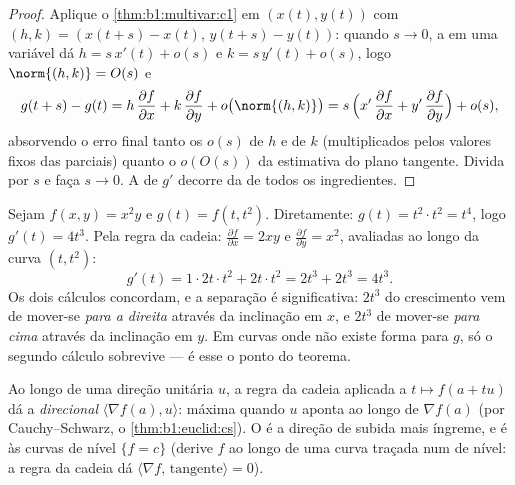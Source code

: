 \begin{proof}
Aplique o \cref{thm:b1:multivar:c1} em $(x(t), y(t))$ com $(h, k) =
(x(t+s) - x(t),\, y(t+s) - y(t))$: quando $s \to 0$, a 
em uma variável dá $h = s\,x'(t) + o(s)$ e $k = s\,y'(t)
+ o(s)$, logo $\norm{(h, k)} = O(s)$ e
\[
g(t+s) - g(t)
= h\,\frac{\partial f}{\partial x} + k\,\frac{\partial
f}{\partial y} + o\bigl(\norm{(h,k)}\bigr)
= s\,\Bigl(x'\,\frac{\partial f}{\partial x} +
y'\,\frac{\partial f}{\partial y}\Bigr) + o(s) ,
\]
absorvendo o erro final tanto os $o(s)$ de $h$ e de $k$
(multiplicados pelos valores fixos das parciais) quanto o $o(O(s))$ da
estimativa do plano tangente. Divida por $s$ e faça $s \to 0$. A
 de $g'$ decorre da de todos os ingredientes.
\end{proof}

\begin{example}
\label{ex:b1:multivar:chainrun}
Sejam $f(x, y) = x^2 y$ e $g(t) = f(t, t^2)$. Diretamente: $g(t) =
t^2\cdot t^2 = t^4$, logo $g'(t) = 4t^3$. Pela regra da
cadeia: $\frac{\partial f}{\partial x} = 2xy$ e $\frac{\partial
f}{\partial y} = x^2$, avaliadas ao longo da curva $(t, t^2)$:
\[
g'(t) = 1\cdot 2t\cdot t^2 + 2t\cdot t^2 = 2t^3 + 2t^3 = 4t^3 .
\]
Os dois cálculos concordam, e a separação é significativa: $2t^3$ do
crescimento vem de mover-se \emph{para a direita} através da
inclinação em $x$, e $2t^3$ de mover-se \emph{para cima} através da
inclinação em $y$. Em curvas onde não existe forma  para $g$,
só o segundo cálculo sobrevive --- é esse o ponto do teorema.
\end{example}

\begin{remark}
Ao longo de uma direção unitária $u$, a regra da cadeia aplicada a
$t \mapsto f(a + tu)$ dá a \emph{ direcional} $\langle \nabla f(a),
u\rangle$: máxima quando $u$ aponta
ao longo de $\nabla f(a)$ (por Cauchy--Schwarz, o \cref{thm:b1:euclid:cs}). O  é a
direção de subida mais íngreme, e é  às curvas de nível
$\{f = c\}$ (derive $f$ ao longo de uma curva traçada num  de
nível: a regra da cadeia dá $\langle\nabla f,\,
\text{tangente}\rangle = 0$).
\end{remark}

